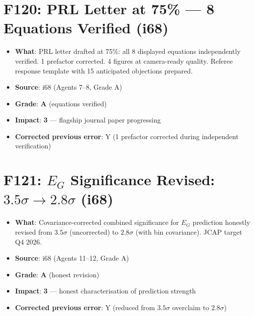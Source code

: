 \documentclass[11pt,a4paper]{article}
\newcommand{\grade}[1]{\textbf{#1}}
\newcommand{\impact}[1]{\textbf{#1}}
\begin{document}
\section{F120: PRL Letter at 75\% --- 8 Equations Verified (i68)}
\begin{itemize}[nosep]
\item \textbf{What}: PRL letter drafted at 75\%: all 8 displayed equations independently verified. 1 prefactor corrected. 4 figures at camera-ready quality. Referee response template with 15 anticipated objections prepared.
\item \textbf{Source}: i68 (Agents 7--8, Grade A)
\item \textbf{Grade}: \grade{A} (equations verified)
\item \textbf{Impact}: \impact{3} --- flagship journal paper progressing
\item \textbf{Corrected previous error}: Y (1 prefactor corrected during independent verification)
\end{itemize}

\section{F121: $E_G$ Significance Revised: $3.5\sigma \to 2.8\sigma$ (i68)}
\begin{itemize}[nosep]
\item \textbf{What}: Covariance-corrected combined significance for $E_G$ prediction honestly revised from $3.5\sigma$ (uncorrected) to $2.8\sigma$ (with bin covariance). JCAP target Q4 2026.
\item \textbf{Source}: i68 (Agents 11--12, Grade A)
\item \textbf{Grade}: \grade{A} (honest revision)
\item \textbf{Impact}: \impact{3} --- honest characterisation of prediction strength
\item \textbf{Corrected previous error}: Y (reduced from $3.5\sigma$ overclaim to $2.8\sigma$)
\end{itemize}

\end{document}
